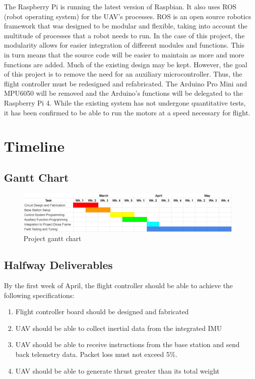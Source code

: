 \documentclass[english]{upeeei}
\begin{document}
\newline
\newline
The Raspberry Pi is running the latest version of Raspbian. It also uses ROS (robot operating system) for
the UAV's processes. ROS is an open source robotics framework that was designed to be modular and flexible, taking into
account the multitude of processes that a robot needs to run. In the case of this project, the modularity allows for
easier integration of different modules and functions. This in turn means that the source code will be easier to maintain
as more and more functions are added.
\newline
\newline
Much of the existing design may be kept. However, the goal of this project is to remove the need for an auxiliary microcontroller.
Thus, the flight controller must be redesigned and refabricated. The Arduino Pro Mini and MPU6050 will be removed and the Arduino's 
functions will be delegated to the Raspberry Pi 4. While the existing system has not undergone quantitative tests, it has been 
confirmed to be able to run the motors at a speed necessary for flight.

\chapter{Timeline}
\section{Gantt Chart}
\begin{figure}[h]
    \centering
    \includegraphics[scale=0.6]{images/gantt_chart.PNG}
    \caption{Project gantt chart}
    \label{fig:gantt_chart}
\end{figure}
\section{Halfway Deliverables}
By the first week of April, the flight controller should be able to achieve the following specifications:
\begin{enumerate}
    \item Flight controller board should be designed and fabricated
    \item UAV should be able to collect inertial data from the integrated IMU
    \item UAV should be able to receive instructions from the base station and send back telemetry data. Packet loss must not exceed 5\%.
    \item UAV should be able to generate thrust greater than its total weight
\end{enumerate}
\end{document}
